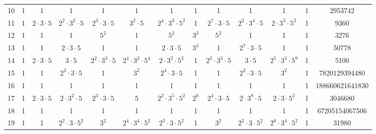 \begin{table}
\begin{center}
\begin{adjustbox}{max width=\textwidth}
\begin{tabular}{|c|ccccccccccc|c|}
10& 1&1&1&1&1&1&1&1&1&1&1&2953742\\
11& 1& $2\cdot 3\cdot 5$& $2^2\cdot 3^2\cdot 5$& $2^3\cdot 3\cdot 5$& $3^2\cdot 5$& $2^4\cdot 3^3\cdot 5^2$&1& $2^7\cdot 3\cdot 5$& $2^2\cdot 3^4\cdot 5$& $2\cdot 3^3\cdot 5^2$&1&9360\\
12& 1&1&1& $5^2$&1& $5^2$& $3^3$& $5^2$&1&1&1&3276\\
13& 1&1& $2\cdot 3\cdot 5$&1&1& $2\cdot 3\cdot 5$& $3^3$&1& $2^7\cdot 3\cdot 5$&1&1&50778\\
14& 1& $2\cdot 3\cdot 5$& $3\cdot 5$& $2^2\cdot 3^3\cdot 5$& $2^4\cdot 3^2\cdot 5^4$& $2\cdot 3^2\cdot 5^2$&1& $2^2\cdot 3^3\cdot 5$& $3\cdot 5$& $2^5\cdot 3^3\cdot 5^9$&1&5100\\
15& 1&1& $2^2\cdot 3\cdot 5$&1& $3^2$& $2^4\cdot 3\cdot 5$&1&1& $2^2\cdot 3\cdot 5$& $3^2$&1&7820129394480\\
16& 1&1&1&1&1&1&1&1&1&1&1&188660621641830\\
17& 1& $2\cdot 3\cdot 5$& $2\cdot 3^2\cdot 5$& $2^3\cdot 3\cdot 5$& $5$& $2^2\cdot 3^5\cdot 5^2$& $2^6$& $2^4\cdot 3\cdot 5$& $2\cdot 3^8\cdot 5$& $2\cdot 3\cdot 5^2$&1&3046680\\
18& 1&1&1&1&1&1&1&1&1&1&1&67205154067506\\
19& 1&1& $2^2\cdot 3\cdot 5^2$& $3^2$& $2^4\cdot 3^4\cdot 5^2$& $2^3\cdot 3\cdot 5^2$&1& $3^2$& $2^2\cdot 3\cdot 5^2$& $2^8\cdot 3^4\cdot 5^2$&1&31980\\

\end{tabular}
\end{adjustbox}
\end{center}
\end{table}

